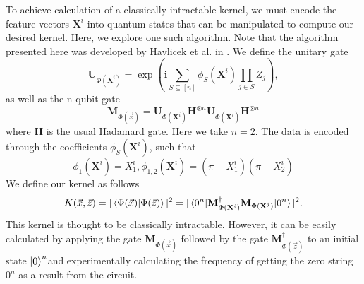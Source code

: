 \documentclass[twocolumn, english]{revtex4-2}
\begin{document}
To achieve calculation of a classically intractable kernel, we must encode the feature vectors $\textbf{X}^{i}$ into quantum states that can be manipulated to compute our desired kernel. Here, we explore one such algorithm. Note that the algorithm presented here was developed by Havlicek et al. in \cite{qsvm}. We define the unitary gate \begin{equation}\textbf{U}_{\Phi(\textbf{X}^{i})}=\exp(\textbf{i}\sum_{S\subseteq[n]}\phi_{S}(\textbf{X}^{i})\prod_{j\in S}Z_{j}),\end{equation} as well as the n-qubit gate \begin{equation}\textbf{M}_{\Phi(\vec{x})}=\textbf{U}_{\Phi(\textbf{X}^{i})}\textbf{H}^{\otimes n}\textbf{U}_{\Phi(\textbf{X}^{i})}\textbf{H}^{\otimes n}\end{equation} where \textbf{H} is the usual Hadamard gate. Here we take $n=2$. The data is encoded through the coefficients $\phi_{S}(\textbf{X}^{i})$, such that \begin{equation}\phi_{1}(\textbf{X}^{i})=X_{1}^{i}, \phi_{1, 2}(\textbf{X}^{i})=(\pi-X_{1}^{i})(\pi-X_{2}^{i})\end{equation} We define our kernel as follows \begin{equation}K(\vec{x}, \vec{z})=|\braket{\Phi(\vec{x})|\Phi(\vec{z})}|^2 = |\braket{0^n|\textbf{M}^{\dag}_{\Phi(\textbf{X}^{i})}\textbf{M}_{\Phi(\textbf{X}^{j})}|0^n}|^2. \end{equation} This kernel is thought to be classically intractable. However, it can be easily calculated by applying the gate $\textbf{M}_{\Phi(\vec{x})}$ followed by the gate $\textbf{M}^{\dag}_{\Phi(\vec{z})}$ to an initial state $\ket{0}^{n}$and experimentally calculating the frequency of getting the zero string $0^n$ as a result from the circuit. 
\end{document}
